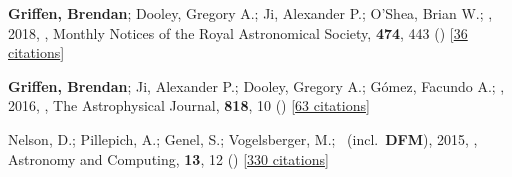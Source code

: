 \item[{\color{numcolor}\scriptsize3}] \textbf{Griffen, Brendan}; Dooley, Gregory A.; Ji, Alexander P.; O'Shea, Brian W.; \etal, 2018, , Monthly Notices of the Royal Astronomical Society, \textbf{474}, 443 () [\href{https://ui.adsabs.harvard.edu/abs/2018MNRAS.474..443G}{36 citations}]

\item[{\color{numcolor}\scriptsize2}] \textbf{Griffen, Brendan}; Ji, Alexander P.; Dooley, Gregory A.; G{\'o}mez, Facundo A.; \etal, 2016, , The Astrophysical Journal, \textbf{818}, 10 () [\href{https://ui.adsabs.harvard.edu/abs/2016ApJ...818...10G}{63 citations}]

\item[{\color{numcolor}\scriptsize1}] Nelson, D.; Pillepich, A.; Genel, S.; Vogelsberger, M.; \etal\ (incl.\ \textbf{DFM}), 2015, , Astronomy and Computing, \textbf{13}, 12 () [\href{https://ui.adsabs.harvard.edu/abs/2015A&C....13...12N}{330 citations}]